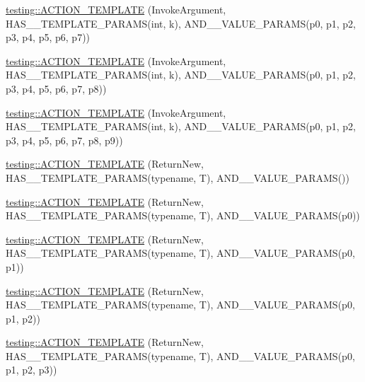 \begin{DoxyCompactItemize}
\item 
\mbox{\hyperlink{namespacetesting_a8725892aafb62cc8f6f76280d29595d8}{testing\+::\+A\+C\+T\+I\+O\+N\+\_\+\+T\+E\+M\+P\+L\+A\+TE}} (Invoke\+Argument, H\+A\+S\+\_\+\_\+\+T\+E\+M\+P\+L\+A\+T\+E\+\_\+\+P\+A\+R\+A\+MS(int, k), A\+N\+D\+\_\+\_\+\+V\+A\+L\+U\+E\+\_\+\+P\+A\+R\+A\+MS(p0, p1, p2, p3, p4, p5, p6, p7))
\item 
\mbox{\hyperlink{namespacetesting_a910551adbfeb1854071ef55ae54a5c0f}{testing\+::\+A\+C\+T\+I\+O\+N\+\_\+\+T\+E\+M\+P\+L\+A\+TE}} (Invoke\+Argument, H\+A\+S\+\_\+\_\+\+T\+E\+M\+P\+L\+A\+T\+E\+\_\+\+P\+A\+R\+A\+MS(int, k), A\+N\+D\+\_\+\_\+\+V\+A\+L\+U\+E\+\_\+\+P\+A\+R\+A\+MS(p0, p1, p2, p3, p4, p5, p6, p7, p8))
\item 
\mbox{\hyperlink{namespacetesting_ab7bf885ff274cbdc09f19c39e43b7f2b}{testing\+::\+A\+C\+T\+I\+O\+N\+\_\+\+T\+E\+M\+P\+L\+A\+TE}} (Invoke\+Argument, H\+A\+S\+\_\+\_\+\+T\+E\+M\+P\+L\+A\+T\+E\+\_\+\+P\+A\+R\+A\+MS(int, k), A\+N\+D\+\_\+\_\+\+V\+A\+L\+U\+E\+\_\+\+P\+A\+R\+A\+MS(p0, p1, p2, p3, p4, p5, p6, p7, p8, p9))
\item 
\mbox{\hyperlink{namespacetesting_a468e601467d018ab7566f321d3f7e871}{testing\+::\+A\+C\+T\+I\+O\+N\+\_\+\+T\+E\+M\+P\+L\+A\+TE}} (Return\+New, H\+A\+S\+\_\+\_\+\+T\+E\+M\+P\+L\+A\+T\+E\+\_\+\+P\+A\+R\+A\+MS(typename, T), A\+N\+D\+\_\+\_\+\+V\+A\+L\+U\+E\+\_\+\+P\+A\+R\+A\+MS())
\item 
\mbox{\hyperlink{namespacetesting_af07e911d69b8efb03bddbd0332f79ba0}{testing\+::\+A\+C\+T\+I\+O\+N\+\_\+\+T\+E\+M\+P\+L\+A\+TE}} (Return\+New, H\+A\+S\+\_\+\_\+\+T\+E\+M\+P\+L\+A\+T\+E\+\_\+\+P\+A\+R\+A\+MS(typename, T), A\+N\+D\+\_\+\_\+\+V\+A\+L\+U\+E\+\_\+\+P\+A\+R\+A\+MS(p0))
\item 
\mbox{\hyperlink{namespacetesting_ad418620ed637e789f91d029f4fe85b4b}{testing\+::\+A\+C\+T\+I\+O\+N\+\_\+\+T\+E\+M\+P\+L\+A\+TE}} (Return\+New, H\+A\+S\+\_\+\_\+\+T\+E\+M\+P\+L\+A\+T\+E\+\_\+\+P\+A\+R\+A\+MS(typename, T), A\+N\+D\+\_\+\_\+\+V\+A\+L\+U\+E\+\_\+\+P\+A\+R\+A\+MS(p0, p1))
\item 
\mbox{\hyperlink{namespacetesting_ac24511eb64ebe2c2927feaf285ac3785}{testing\+::\+A\+C\+T\+I\+O\+N\+\_\+\+T\+E\+M\+P\+L\+A\+TE}} (Return\+New, H\+A\+S\+\_\+\_\+\+T\+E\+M\+P\+L\+A\+T\+E\+\_\+\+P\+A\+R\+A\+MS(typename, T), A\+N\+D\+\_\+\_\+\+V\+A\+L\+U\+E\+\_\+\+P\+A\+R\+A\+MS(p0, p1, p2))
\item 
\mbox{\hyperlink{namespacetesting_afc5a3710d11bdee2023d8402b84d86ed}{testing\+::\+A\+C\+T\+I\+O\+N\+\_\+\+T\+E\+M\+P\+L\+A\+TE}} (Return\+New, H\+A\+S\+\_\+\_\+\+T\+E\+M\+P\+L\+A\+T\+E\+\_\+\+P\+A\+R\+A\+MS(typename, T), A\+N\+D\+\_\+\_\+\+V\+A\+L\+U\+E\+\_\+\+P\+A\+R\+A\+MS(p0, p1, p2, p3))

\end{DoxyCompactItemize}
